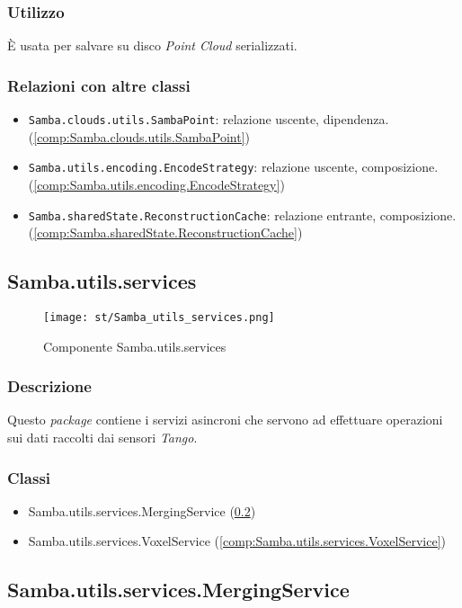 \subsubsection{Utilizzo}
È usata per salvare su disco \emph{Point Cloud} serializzati.
\subsubsection{Relazioni con altre classi}
\begin{itemize}
	\item \texttt{Samba.clouds.utils.SambaPoint}: relazione uscente, dipendenza. (\ref{comp:Samba.clouds.utils.SambaPoint})
	\item \texttt{Samba.utils.encoding.EncodeStrategy}: relazione uscente, composizione. (\ref{comp:Samba.utils.encoding.EncodeStrategy})
	\item \texttt{Samba.sharedState.ReconstructionCache}: relazione entrante, composizione. (\ref{comp:Samba.sharedState.ReconstructionCache})
\end{itemize}

\newpage
\subsection{Samba.utils.services}\label{comp:Samba.utils.services}
\begin{figure}[H] 
    \centering 
    \texttt{[image: st/Samba\_utils\_services.png]} 
    \caption{Componente Samba.utils.services}
\end{figure}
\subsubsection{Descrizione}
Questo \emph{package} contiene i servizi asincroni che servono ad effettuare operazioni sui dati raccolti dai sensori \emph{Tango}.
\subsubsection{Classi}
\begin{itemize}
	\item Samba.utils.services.MergingService (\ref{comp:Samba.utils.services.MergingService})
	\item Samba.utils.services.VoxelService (\ref{comp:Samba.utils.services.VoxelService})
\end{itemize}

\subsection{Samba.utils.services.MergingService}\label{comp:Samba.utils.services.MergingService}
